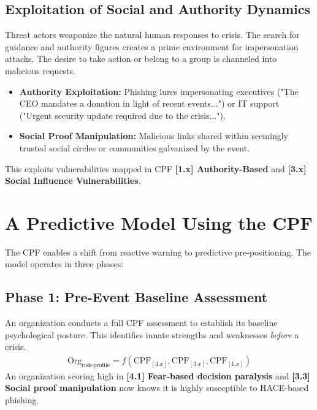 \documentclass[11pt,a4paper]{article}
\begin{document}
\subsection{Exploitation of Social and Authority Dynamics}
Threat actors weaponize the natural human responses to crisis. The search for guidance and authority figures creates a prime environment for impersonation attacks. The desire to take action or belong to a group is channeled into malicious requests.
\begin{itemize}
\item \textbf{Authority Exploitation:} Phishing lures impersonating executives ("The CEO mandates a donation in light of recent events...") or IT support ("Urgent security update required due to the crisis...").
\item \textbf{Social Proof Manipulation:} Malicious links shared within seemingly trusted social circles or communities galvanized by the event.
\end{itemize}
This exploits vulnerabilities mapped in CPF \textbf{[1.x] Authority-Based} and \textbf{[3.x] Social Influence Vulnerabilities}.

\section{A Predictive Model Using the CPF}
The CPF enables a shift from reactive warning to predictive pre-positioning. The model operates in three phases:

\subsection{Phase 1: Pre-Event Baseline Assessment}
An organization conducts a full CPF assessment to establish its baseline psychological posture. This identifies innate strengths and weaknesses \textit{before} a crisis.
\begin{align*}
\text{Org}_{\text{risk-profile}} = f(\text{CPF}_{[4.x]}, \text{CPF}_{[3.x]}, \text{CPF}_{[1.x]})
\end{align*}
An organization scoring high in \textbf{[4.1] Fear-based decision paralysis} and \textbf{[3.3] Social proof manipulation} now knows it is highly susceptible to HACE-based phishing.
\end{document}
